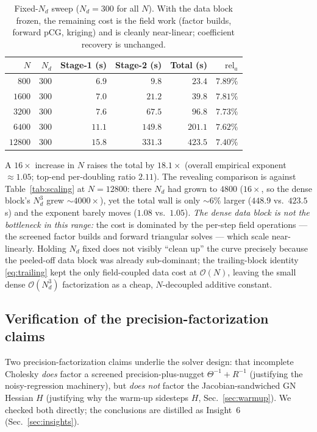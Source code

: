\documentclass[11pt]{article}
\newcommand{\inv}{^{-1}}
\newcommand{\Th}{\Theta}
\newcommand{\bigO}{\mathcal{O}}
\begin{document}
\begin{table}[h]
\centering
\caption{Fixed-$N_d$ sweep ($N_d=300$ for all $N$). With the data block frozen,
the remaining cost is the field work (factor builds, forward pCG, kriging) and is
cleanly near-linear; coefficient recovery is unchanged.}
\label{tab:fixedNd}
\begin{tabular}{rrrrrr}
\toprule
$N$ & $N_d$ & Stage-1 (s) & Stage-2 (s) & Total (s) & $\mathrm{rel}_a$ \\
\midrule
$800$   & $300$ & $6.9$  & $9.8$   & $23.4$  & $7.89\%$ \\
$1600$  & $300$ & $7.0$  & $21.2$  & $39.8$  & $7.81\%$ \\
$3200$  & $300$ & $7.6$  & $67.5$  & $96.8$  & $7.73\%$ \\
$6400$  & $300$ & $11.1$ & $149.8$ & $201.1$ & $7.62\%$ \\
$12800$ & $300$ & $15.8$ & $331.3$ & $423.5$ & $7.40\%$ \\
\bottomrule
\end{tabular}
\end{table}

\noindent A $16\times$ increase in $N$ raises the total by $18.1\times$ (overall
empirical exponent $\approx 1.05$; top-end per-doubling ratio $2.11$). The
revealing comparison is against Table~\ref{tab:scaling} at $N=12800$: there
$N_d$ had grown to $4800$ ($16\times$, so the dense block's $N_d^3$ grew
$\sim\!4000\times$), yet the total wall is only $\sim\!6\%$ larger ($448.9$ vs.\
$423.5$\,s) and the exponent barely moves ($1.08$ vs.\ $1.05$). \emph{The dense
data block is not the bottleneck in this range:} the cost is dominated by the
per-step field operations --- the screened factor builds and forward triangular
solves --- which scale near-linearly. Holding $N_d$ fixed does not visibly
``clean up'' the curve precisely because the peeled-off data block was already
sub-dominant; the trailing-block identity \eqref{eq:trailing} kept the only
field-coupled data cost at $\bigO(N)$, leaving the small dense $\bigO(N_d^3)$
factorization as a cheap, $N$-decoupled additive constant.

\subsection{Verification of the precision-factorization claims}\label{sec:verif}

Two precision-factorization claims underlie the solver design: that incomplete
Cholesky \emph{does} factor a screened precision-plus-nugget $\Th\inv+R\inv$
(justifying the noisy-regression machinery), but \emph{does not} factor the
Jacobian-sandwiched GN Hessian $H$ (justifying why the warm-up sidesteps $H$,
Sec.~\ref{sec:warmup}). We checked both directly; the conclusions are distilled
as Insight~6 (Sec.~\ref{sec:insights}).
\end{document}
